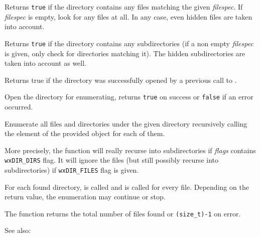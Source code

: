 \label{wxdirhasfiles}


Returns {\tt true} if the directory contains any files matching the given 
{\it filespec}. If {\it filespec} is empty, look for any files at all. In any
case, even hidden files are taken into account.


\label{wxdirhassubdirs}


Returns {\tt true} if the directory contains any subdirectories (if a non
empty {\it filespec} is given, only check for directories matching it).
The hidden subdirectories are taken into account as well.


\label{wxdirisopened}


Returns true if the directory was successfully opened by a previous call to 
.


\label{wxdiropen}


Open the directory for enumerating, returns {\tt true} on success
or {\tt false} if an error occurred.


\label{wxdirtraverse}


Enumerate all files and directories under the given directory recursively
calling the element of the provided  
object for each of them.

More precisely, the function will really recurse into subdirectories if 
{\it flags} contains {\tt wxDIR\_DIRS} flag. It will ignore the files (but
still possibly recurse into subdirectories) if {\tt wxDIR\_FILES} flag is
given.

For each found directory,  is called
and  is called for every file.
Depending on the return value, the enumeration may continue or stop.

The function returns the total number of files found or {\tt (size\_t)-1} on
error.

See also: 

